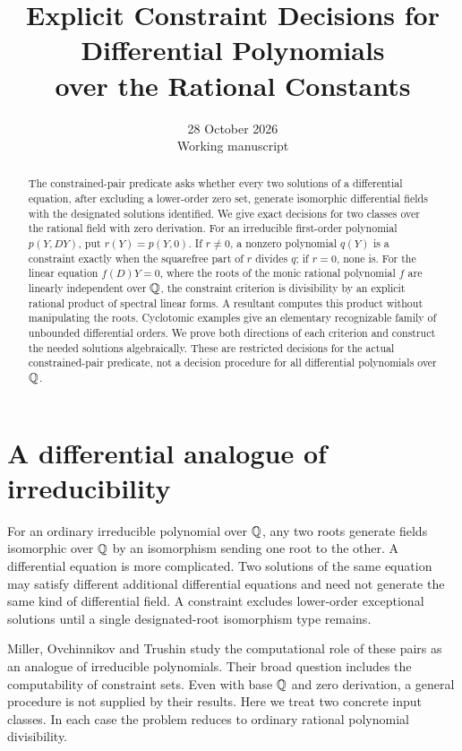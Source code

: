 \documentclass[11pt]{article}
\title{Explicit Constraint Decisions for Differential Polynomials\\over the Rational Constants}
\author{}
\date{28 October 2026\\Working manuscript}
\begin{document}
\maketitle
\begin{abstract}
The constrained-pair predicate asks whether every two solutions of a
differential equation, after excluding a lower-order zero set, generate
isomorphic differential fields with the designated solutions identified.
We give exact decisions for two classes over the rational field with
zero derivation. For an irreducible first-order polynomial $p(Y,DY)$,
put $r(Y)=p(Y,0)$. If $r\ne0$, a nonzero polynomial $q(Y)$ is a
constraint exactly when the squarefree part of $r$ divides $q$; if
$r=0$, none is. For the linear equation $f(D)Y=0$, where the roots of
the monic rational polynomial $f$ are linearly independent over $\mathbb Q$,
the constraint criterion is divisibility by an explicit rational
product of spectral linear forms. A resultant computes this product
without manipulating the roots. Cyclotomic examples give an elementary
recognizable family of unbounded differential orders. We prove both
directions of each criterion and construct the needed solutions
algebraically. These are restricted decisions for the actual
constrained-pair predicate, not a decision procedure for all
differential polynomials over $\mathbb Q$.
\end{abstract}
\tableofcontents

\section{A differential analogue of irreducibility}

For an ordinary irreducible polynomial over $\mathbb Q$, any two roots
generate fields isomorphic over $\mathbb Q$ by an isomorphism sending one
root to the other. A differential equation is more complicated.
Two solutions of the same equation may satisfy different additional
differential equations and need not generate the same kind of
differential field. A constraint excludes lower-order exceptional
solutions until a single designated-root isomorphism type remains.

Miller, Ovchinnikov and Trushin \cite{MOT} study the computational
role of these pairs as an analogue of irreducible polynomials.
Their broad question includes the computability of constraint
sets. Even with base $\mathbb Q$ and zero derivation, a general procedure
is not supplied by their results. Here we treat two concrete input
classes. In each case the problem reduces to ordinary rational
polynomial divisibility.
\end{document}
